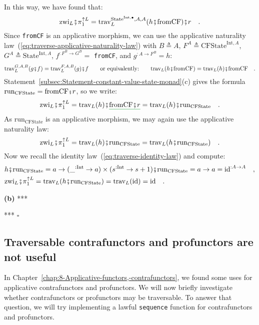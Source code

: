 In this way, we have found that:
\[
\text{zwi}_{L}\bef\pi_{1}^{\uparrow L}=\text{trav}_{L}^{\text{State}^{\text{Int},\bullet},A,A}(h\bef\text{fromCF})\bef r\quad.
\]
Since \lstinline!fromCF! is an applicative morphism, we can use the
applicative naturality law~(\ref{eq:traverse-applicative-naturality-law})
with $B\triangleq A$, $F^{A}\triangleq\text{CFState}^{\text{Int},A}$,
$G^{A}\triangleq\text{State}^{\text{Int},A}$, $f^{:F^{B}\rightarrow G^{B}}=$
\lstinline!fromCF!, and $g^{:A\rightarrow F^{B}}=h$:
\[
\text{trav}_{L}^{G,A,B}(g\bef f)=\text{trav}_{L}^{F,A,B}(g)\bef f\quad\quad\text{or equivalently:}\quad\quad\text{trav}_{L}(h\bef\text{fromCF})=\text{trav}_{L}(h)\bef\text{fromCF}\quad.
\]
Statement~\ref{subsec:Statement-constant-value-state-monad}(c) gives
the formula $\text{run}_{\text{CFState}}=\text{fromCF}\bef r$, so
we write:
\[
\text{zwi}_{L}\bef\pi_{1}^{\uparrow L}=\text{trav}_{L}(h)\bef\gunderline{\text{fromCF}\bef r}=\text{trav}_{L}(h)\bef\text{run}_{\text{CFState}}\quad.
\]
As $\text{run}_{\text{CFState}}$ is an applicative morphism, we may
again use the applicative naturality law:
\[
\text{zwi}_{L}\bef\pi_{1}^{\uparrow L}=\text{trav}_{L}(h)\bef\text{run}_{\text{CFState}}=\text{trav}_{L}(h\bef\text{run}_{\text{CFState}})\quad.
\]
Now we recall the identity law~(\ref{eq:traverse-identity-law})
and compute:
\begin{align*}
 & h\bef\text{run}_{\text{CFState}}=a\rightarrow(\_^{:\text{Int}}\rightarrow a)\times(s^{:\text{Int}}\rightarrow s+1)\bef\text{run}_{\text{CFState}}=a\rightarrow a=\text{id}^{:A\rightarrow A}\quad,\\
 & \text{zwi}_{L}\bef\pi_{1}^{\uparrow L}=\text{trav}_{L}(h\bef\text{run}_{\text{CFState}})=\text{trav}_{L}(\text{id})=\text{id}\quad.
\end{align*}

\textbf{(b)} {*}{*}{*}

{*}{*}{*} $\square$

\subsection{Traversable contrafunctors and profunctors are not useful}

In Chapter~\ref{chap:8-Applicative-functors,-contrafunctors}, we
found some uses for applicative contrafunctors and profunctors. We
will now briefly investigate whether contrafunctors or profunctors
may be traversable. To answer that question, we will try implementing
a lawful \lstinline!sequence! function for contrafunctors and profunctors.

